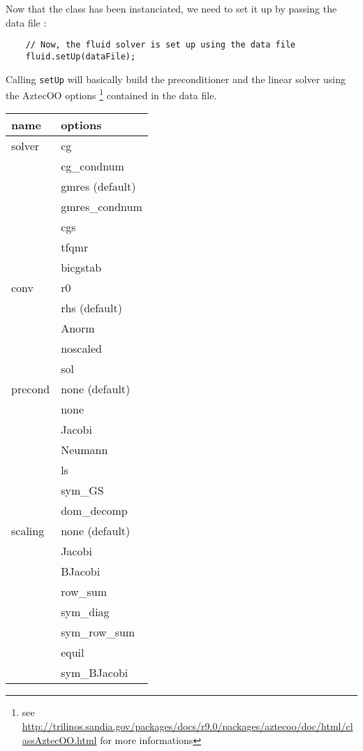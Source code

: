 {\begin{verbatim}
\end{verbatim}

Now that the class has been instanciated, we need to set it up by passing the data file :

\begin{verbatim}
    // Now, the fluid solver is set up using the data file
    fluid.setUp(dataFile);
\end{verbatim}

Calling \verb|setUp|
will basically build the preconditioner and the linear solver using the AztecOO options \footnote{see \url{http://trilinos.sandia.gov/packages/docs/r9.0/packages/aztecoo/doc/html/classAztecOO.html} for more informations }
contained in the data file.

\begin{table}
\begin{center}
\begin{tabular}{|l|l|}
\hline
name & options\\
\hline \hline
solver & cg \\
& cg\_condnum\\
& gmres (default)\\
& gmres\_condnum\\
& cgs\\
& tfqmr\\
& bicgstab\\
\hline
conv & r0\\
& rhs (default) \\
& Anorm  \\
& noscaled  \\
& sol \\
\hline

precond & none (default) \\
& none \\
&Jacobi \\
&Neumann \\
&ls \\
&sym\_GS \\
&dom\_decomp \\
\hline

scaling & none (default) \\
&    Jacobi \\
&    BJacobi \\
&    row\_sum \\
&    sym\_diag \\
&    sym\_row\_sum \\
&    equil \\
&    sym\_BJacobi \\


\end{tabular}
\end{center}
\end{table}}
